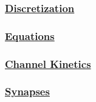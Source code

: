 \documentclass[12pt]{article}
\begin{document}
\subsubsection*{\href{../pub-purkinje-deschutter-discretization/pub-purkinje-deschutter-discretization.tex}{\bf Discretization}}

\subsubsection*{\href{../pub-purkinje-deschutter-equations/pub-purkinje-deschutter-equations.tex}{\bf Equations}}


\subsubsection*{\href{../pub-purkinje-deschutter-kinetics/pub-purkinje-deschutter-kinetics.tex}{\bf Channel Kinetics}}

\subsubsection*{\href{../pub-purkinje-deschutter-synapses/pub-purkinje-deschutter-synapses.tex}{\bf Synapses}}


\end{document}
